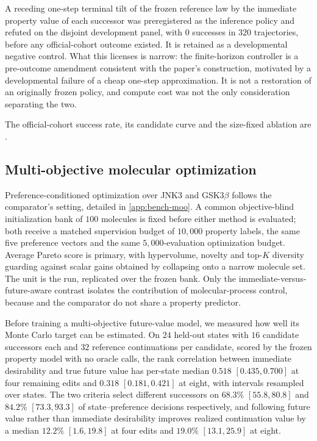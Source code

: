 A receding one-step terminal tilt of the frozen reference law by the immediate property value of each successor was preregistered as the inference policy and refuted on the disjoint development panel, with $0$ successes in $320$ trajectories, before any official-cohort outcome existed. It is retained as a developmental negative control. What this licenses is narrow: the finite-horizon controller is a pre-outcome amendment consistent with the paper's construction, motivated by a developmental failure of a cheap one-step approximation. It is not a restoration of an originally frozen policy, and compute cost was not the only consideration separating the two.

The official-cohort success rate, its candidate curve and the size-fixed ablation are \XXX{}.

\subsection{Multi-objective molecular optimization}
\label{app:exp-pareto}

Preference-conditioned optimization over JNK3 and GSK3$\beta$ follows the comparator's setting, detailed in \cref{app:bench-moo}. A common objective-blind initialization bank of $100$ molecules is fixed before either method is evaluated; both receive a matched supervision budget of $10{,}000$ property labels, the same five preference vectors and the same $5{,}000$-evaluation optimization budget. Average Pareto score is primary, with hypervolume, novelty and top-$K$ diversity guarding against scalar gains obtained by collapsing onto a narrow molecule set. The unit is the run, replicated over the frozen bank. Only the immediate-versus-future-aware contrast isolates the contribution of molecular-process control, because \method{} and the comparator do not share a property predictor.

Before training a multi-objective future-value model, we measured how well its Monte Carlo target can be estimated. On $24$ held-out states with $16$ candidate successors each and $32$ reference continuations per candidate, scored by the frozen property model with no oracle calls, the rank correlation between immediate desirability and true future value has per-state median $0.518$ $[0.435,0.700]$ at four remaining edits and $0.318$ $[0.181,0.421]$ at eight, with intervals resampled over states. The two criteria select different successors on $68.3\%$ $[55.8,80.8]$ and $84.2\%$ $[73.3,93.3]$ of state--preference decisions respectively, and following future value rather than immediate desirability improves realized continuation value by a median $12.2\%$ $[1.6,19.8]$ at four edits and $19.0\%$ $[13.1,25.9]$ at eight.

